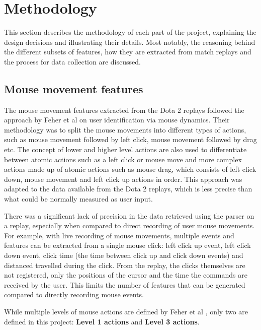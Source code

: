 \documentclass[Report.tex]{subfiles}
\begin{document}
\section{Methodology}
This section describes the methodology of each part of the project, explaining the design decisions and illustrating their details. Most notably, the reasoning behind the different subsets of features, how they are extracted from match replays and the process for data collection are discussed.

\subsection{Mouse movement features}\label{sec:mm-features}
The mouse movement features extracted from the Dota 2 replays followed the approach by Feher et al \cite{mouse-dynamics} on user identification via mouse dynamics. Their methodology was to split the mouse movements into different types of actions, such as mouse movement followed by left click, mouse movement followed by drag etc. The concept of lower and higher level actions are also used to differentiate between atomic actions such as a left click or mouse move and more complex actions made up of atomic actions such as mouse drag, which consists of left click down, mouse movement and left click up actions in order. This approach was adapted to the data available from the Dota 2 replays, which is less precise than what could be normally measured as user input. 

There was a significant lack of precision in the data retrieved using the parser on a replay, especially when compared to direct recording of user mouse movements. For example, with live recording of mouse movements, multiple events and features can be extracted from a single mouse click: left click up event, left click down event, click time (the time between click up and click down events) and distanced travelled during the click. From the replay, the clicks themselves are not registered, only the positions of the cursor and the time the commands are received by the user. This limits the number of features that can be generated compared to directly recording mouse events.

While multiple levels of mouse actions are defined by Feher et al \cite{mouse-dynamics}, only two are defined in this project: \textbf{Level 1 actions} and \textbf{Level 3 actions}.
\end{document}

